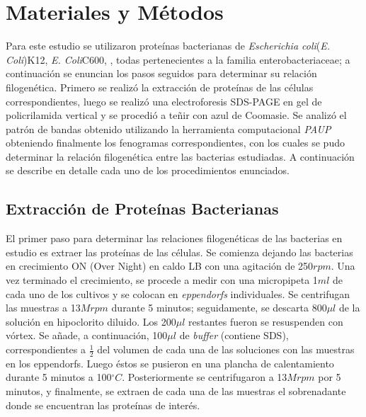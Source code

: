 \documentclass[%
 reprint,
 amsmath,amssymb,
 aps,
showkeys
]{revtex4-1}
\begin{document}
	
\section{\label{sec:MyM}Materiales y Métodos}
	Para este estudio se utilizaron proteínas bacterianas de \textit{Escherichia coli}(\textit{E. Coli})K12, \textit{E. Coli}C600, ,  todas pertenecientes a la familia enterobacteriaceae; a continuación se enuncian los pasos seguidos para determinar su relación filogenética.
	Primero se realizó la extracción de proteínas de las células correspondientes, luego se realizó una electroforesis SDS-PAGE en gel de policrilamida vertical y se procedió a teñir con azul de Coomasie. Se analizó el patrón de bandas obtenido utilizando la herramienta computacional \textit{PAUP} obteniendo finalmente los fenogramas correspondientes, con los cuales se pudo determinar la relación filogenética entre las bacterias estudiadas. A continuación se describe en detalle cada uno de los procedimientos enunciados.
	
	\subsection{\label{sec:ExtraMet}Extracción de Proteínas Bacterianas}
		El primer paso para determinar las relaciones filogenéticas de las bacterias en estudio es extraer las proteínas de las células.
		Se comienza dejando las bacterias en crecimiento ON (Over Night) en caldo LB con una agitación de 250$rpm$. Una vez terminado el crecimiento, se procede a medir con una micropipeta 1$ml$ de cada uno de los cultivos y se colocan en \textit{eppendorfs} individuales. Se centrifugan las muestras a 13$Mrpm$ durante 5 minutos; seguidamente, se descarta 800$\mu l$ de la solución en hipoclorito diluido. Los 200$\mu l$ restantes fueron se resuspenden con vórtex. Se añade, a continuación, 100$\mu l$ de \textit{buffer} (contiene SDS), correspondientes a $\frac{1}{2}$ del volumen de cada una de las soluciones con las muestras en los eppendorfs. Luego éstos se pusieron en una plancha de calentamiento durante 5 minutos a 100$^{\circ}C$. Posteriormente se centrifugaron a 13$Mrpm$ por 5 minutos, y finalmente, se extraen de cada una de las muestras el sobrenadante donde se encuentran las proteínas de interés.
		
			
\end{document}

